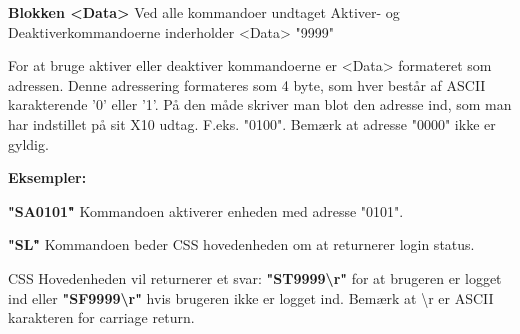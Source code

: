 \textbf{Blokken <Data>}
Ved alle kommandoer undtaget Aktiver- og Deaktiverkommandoerne inderholder <Data> "9999"

For at bruge aktiver eller deaktiver kommandoerne er <Data> formateret som adressen. Denne adressering formateres som 4 byte, som hver består af ASCII karakterende '0' eller '1'. På den måde skriver man blot den adresse ind, som man har indstillet på sit X10 udtag. F.eks. "0100".
Bemærk at adresse "0000" ikke er gyldig.

\textbf{Eksempler:}

\textbf{"SA0101\r"}
Kommandoen aktiverer enheden med adresse "0101".

\textbf{"SL\r"}
Kommandoen beder CSS hovedenheden om at returnerer login status.

CSS Hovedenheden vil returnerer et svar:
\textbf{"ST9999\textbackslash r"} for at brugeren er logget ind eller \textbf{"SF9999\textbackslash r"} hvis brugeren ikke er logget ind. Bemærk at \textbackslash r er ASCII karakteren for carriage return.

